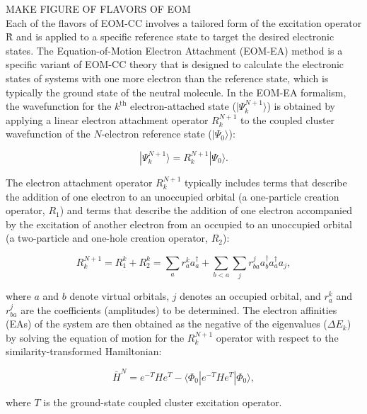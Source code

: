 MAKE FIGURE OF FLAVORS OF EOM\\
Each of the flavors of EOM-CC involves a tailored form of the excitation operator \^{R} and is applied to a specific reference state to target the desired electronic states.
The Equation-of-Motion Electron Attachment (EOM-EA) method is a specific variant of EOM-CC theory that is designed to calculate the electronic states of systems with one more electron than the reference state, which is typically the ground state of the neutral molecule. In the EOM-EA formalism, the wavefunction for the $k^{\text{th}}$ electron-attached state ($|\Psi_k^{N+1}\rangle$) is obtained by applying a linear electron attachment operator $R_k^{N+1}$ to the coupled cluster wavefunction of the $N$-electron reference state ($|\Psi_0\rangle$):

\begin{equation}
    |\Psi_k^{N+1}\rangle = R_k^{N+1} |\Psi_0\rangle.
\end{equation}

The electron attachment operator $R_k^{N+1}$ typically includes terms that describe the addition of one electron to an unoccupied orbital (a one-particle creation operator, $R_1$) and terms that describe the addition of one electron accompanied by the excitation of another electron from an occupied to an unoccupied orbital (a two-particle and one-hole creation operator, $R_2$):

\begin{equation}
    R_k^{N+1} = R_1^k + R_2^k = \sum_{a} r_a^k a_a^{\dagger} + \sum_{b<a} \sum_{j} r_{ba}^{j} a_b^{\dagger} a_a^{\dagger} a_j,
\end{equation}

where $a$ and $b$ denote virtual orbitals, $j$ denotes an occupied orbital, and $r_a^k$ and $r_{ba}^{j}$ are the coefficients (amplitudes) to be determined. The electron affinities (EAs) of the system are then obtained as the negative of the eigenvalues ($\Delta E_k$) by solving the equation of motion for the $R_k^{N+1}$ operator with respect to the similarity-transformed Hamiltonian:

\begin{equation}
    \bar{H}^{N} = e^{-T} H e^{T} - \langle \Phi_0 | e^{-T} H e^{T} | \Phi_0 \rangle,
\end{equation}

where $T$ is the ground-state coupled cluster excitation operator.


